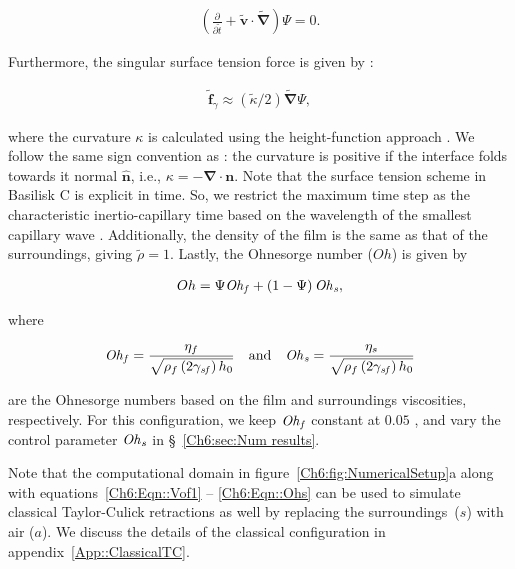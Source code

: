 \begin{align}
	\label{Ch6:Eqn::Vof1}
	\left(\frac{\partial}{\partial\tilde{t}} + \boldsymbol{\tilde{v}\cdot\tilde{\nabla}}\right)\Psi = 0.
\end{align}

\noindent Furthermore, the singular surface tension force is given by \citep{brackbill1992continuum}:

\begin{align}\label{Ch6:Eqn::SurfaceTension1}
	\boldsymbol{\tilde{f}}_\gamma \approx \left(\tilde{\kappa}/2\right)\boldsymbol{\tilde{\nabla}}\Psi,
\end{align}

\noindent where the curvature $\kappa$ is calculated using the height-function approach \citep{popinet2009accurate}. We follow the same sign convention as \citet[][see page 33]{tryggvason2011direct}: the curvature is positive if the interface folds towards it normal $\boldsymbol{\hat{n}}$, i.e., $\kappa = - \boldsymbol{\nabla \cdot n}$. Note that the surface tension scheme in Basilisk C is explicit in time. So, we restrict the maximum time step as the characteristic inertio-capillary time based on the wavelength of the smallest capillary wave \citep{popinet2009accurate, basiliskpopinet2}. Additionally, the density of the film is the same as that of the surroundings, giving $\tilde{\rho} = 1$. Lastly, the Ohnesorge number ($Oh$) is given by

\begin{align}
	\label{Ch6:Eqn::Oh2}
	Oh = \Psi \mathit{Oh}_\mathit{f} + \left(1-\Psi\right)\mathit{Oh}_\mathit{s},
\end{align}

\noindent where

\begin{align}
	\label{Ch6:Eqn::Ohs}
	\mathit{Oh}_\mathit{f} = \frac{\eta_f}{\sqrt{\rho_f\left(2\gamma_\mathit{sf}\right)h_0}} \quad \text{and} \quad \mathit{Oh}_\mathit{s} = \frac{\eta_s}{\sqrt{\rho_f\left(2\gamma_\mathit{sf}\right)h_0}}
\end{align}

\noindent are the Ohnesorge numbers based on the film and surroundings viscosities, respectively. For this configuration, we keep $\mathit{Oh}_\mathit{f}$ constant at $0.05$ \citep[based on the experiments of][]{reyssat-2006-epl}, and vary the control parameter $\mathit{Oh}_\mathit{s}$ in \S~\ref{Ch6:sec:Num results}. 

Note that the computational domain in figure~\ref{Ch6:fig:NumericalSetup}a along with equations~\eqref{Ch6:Eqn::Vof1} -- \eqref{Ch6:Eqn::Ohs} can be used to simulate classical Taylor-Culick retractions as well by replacing the surroundings~($s$) with air ($a$). We discuss the details of the classical configuration in appendix~\ref{App::ClassicalTC}. 

